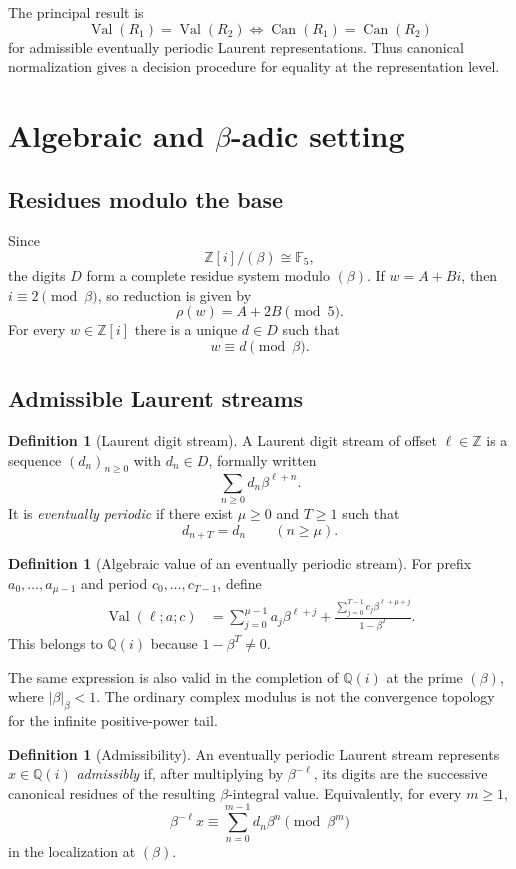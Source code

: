 \documentclass[11pt]{article}
\theoremstyle{definition}
\newtheorem{definition}[theorem]{Definition}
\newcommand{\Zi}{\mathbb{Z}[i]}
\newcommand{\Qi}{\mathbb{Q}(i)}
\newcommand{\Ffive}{\mathbb{F}_5}
\newcommand{\Can}{\operatorname{Can}}
\newcommand{\Value}{\operatorname{Val}}
\begin{document}
The principal result is
\[
\boxed{
\Value(R_1)=\Value(R_2)
\iff
\Can(R_1)=\Can(R_2)
}
\]
for admissible eventually periodic Laurent representations.  Thus canonical normalization gives a decision procedure for equality at the representation level.

\section{Algebraic and $\beta$-adic setting}

\subsection{Residues modulo the base}

Since
\[
\Zi/(\beta)\cong\Ffive,
\]
the digits $D$ form a complete residue system modulo $(\beta)$.  If $w=A+Bi$, then $i\equiv2\pmod\beta$, so reduction is given by
\[
\rho(w)=A+2B\pmod5.
\]
For every $w\in\Zi$ there is a unique $d\in D$ such that
\[
w\equiv d\pmod\beta.
\]

\subsection{Admissible Laurent streams}

\begin{definition}[Laurent digit stream]
A Laurent digit stream of offset $\ell\in\mathbb Z$ is a sequence $(d_n)_{n\ge0}$ with $d_n\in D$, formally written
\[
\sum_{n\ge0}d_n\beta^{\ell+n}.
\]
It is \emph{eventually periodic} if there exist $\mu\ge0$ and $T\ge1$ such that
\[
d_{n+T}=d_n\qquad(n\ge\mu).
\]
\end{definition}

\begin{definition}[Algebraic value of an eventually periodic stream]
For prefix $a_0,\ldots,a_{\mu-1}$ and period $c_0,\ldots,c_{T-1}$, define
\begin{align*}
\Value(\ell;a;c)
&=
\sum_{j=0}^{\mu-1}a_j\beta^{\ell+j}
+
\frac{\sum_{j=0}^{T-1}c_j\beta^{\ell+\mu+j}}
{1-\beta^T}.
\end{align*}
This belongs to $\Qi$ because $1-\beta^T\ne0$.
\end{definition}

The same expression is also valid in the completion of $\Qi$ at the prime $(\beta)$, where $|\beta|_{\beta}<1$.  The ordinary complex modulus is not the convergence topology for the infinite positive-power tail.

\begin{definition}[Admissibility]
An eventually periodic Laurent stream represents $x\in\Qi$ \emph{admissibly} if, after multiplying by $\beta^{-\ell}$, its digits are the successive canonical residues of the resulting $\beta$-integral value.  Equivalently, for every $m\ge1$,
\[
\beta^{-\ell}x\equiv\sum_{n=0}^{m-1}d_n\beta^n\pmod{\beta^m}
\]
in the localization at $(\beta)$.
\end{definition}
\end{document}
